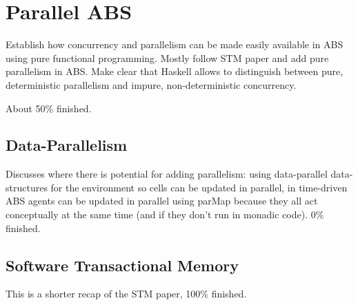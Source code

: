\chapter{Parallel ABS}
\label{ch:parallel_abs}

Establish how concurrency and parallelism can be made easily available in ABS using pure functional programming. Mostly follow STM paper and add pure parallelism in ABS. Make clear that Haskell allows to distinguish between pure, deterministic parallelism and impure, non-deterministic concurrency.

About 50\% finished.

\section{Data-Parallelism}
Discusses where there is potential for adding parallelism: using data-parallel data-structures for the environment so cells can be updated in parallel, in time-driven ABS agents can be updated in parallel using parMap because they all act conceptually at the same time (and if they don't run in monadic code). 0\% finished.

\section{Software Transactional Memory}
This is a shorter recap of the STM paper, 100\% finished.